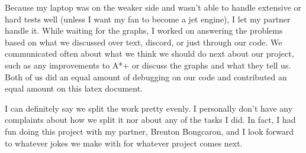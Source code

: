 \documentclass[11pt]{article}
\begin{document}
Because my laptop was on the weaker side and wasn't able to handle extensive or hard tests well (unless I want my fan to become a jet engine), I let my partner handle it. While waiting for the graphs, I worked on answering the problems based on what we discussed over text, discord, or just through our code. We communicated often about what we think we should do next about our project, such as any improvements to A*+ or discuss the graphs and what they tell us. Both of us did an equal amount of debugging on our code and contributed an equal amount on this latex document.

I can definitely say we split the work pretty evenly. I personally don't have any complaints about how we split it nor about any of the tasks I did. In fact, I had fun doing this project with my partner, Brenton Bongcaron, and I look forward to whatever jokes we make with for whatever project comes next.
\end{document}
